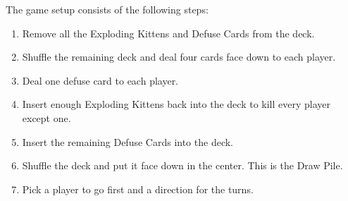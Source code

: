 \documentclass[11pt, fuzz]{article}
\begin{document}
The game setup consists of the following steps:

\begin{enumerate}
    \item Remove all the Exploding Kittens and Defuse Cards from the deck. 
    \item Shuffle the remaining deck and deal four cards face down to each player.
    \item Deal one defuse card to each player. 
    \item Insert enough Exploding Kittens back into the deck to kill every player except one. 
    \item Insert the remaining Defuse Cards into the deck. 
    \item Shuffle the deck and put it face down in the center. This is the Draw Pile. 
    \item Pick a player to go first and a direction for the turns. 
\end{enumerate}
\end{document}
